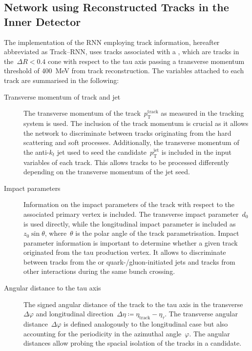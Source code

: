 \subsection{Network using Reconstructed Tracks in the Inner Detector}
\label{sec:rnn_tracks}

The implementation of the RNN employing track information, hereafter abbreviated
as Track--RNN, uses tracks associated with a \tauhadvis, which are tracks in
the~$\Delta R < 0.4$ cone with respect to the tau axis passing a transverse
momentum threshold of \SI{400}{\MeV} from track reconstruction. The variables
attached to each track are summarised in the following:
\begin{description}
\item[Transverse momentum of track and jet] The transverse momentum of the
  track~$p_\text{T}^\text{track}$ as measured in the tracking system is used.
  The inclusion of the track momentum is crucial as it allows the network to
  discriminate between tracks originating from the hard scattering and soft
  processes. Additionally, the transverse momentum of the anti-$k_t$ jet
  used to seed the \tauhadvis candidate~$p_\text{T}^\text{jet}$ is included in
  the input variables of each track. This allows tracks to be processed
  differently depending on the transverse momentum of the jet seed.

\item[Impact parameters] Information on the impact parameters of the track with
  respect to the associated primary vertex is included. The transverse impact
  parameter~$d_0$ is used directly, while the longitudinal impact parameter is
  included as~$z_0 \sin\theta$, where~$\theta$ is the polar angle of the track
  parametrisation.
  Impact parameter information is important to determine whether a given track
  originated from the tau production vertex. It allows to discriminate between
  tracks from the \tauhad or quark-/gluon-initiated jets and tracks from other
  interactions during the same bunch crossing.

\item[Angular distance to the tau axis] The signed angular distance of the track
  to the tau axis in the transverse~$\Delta \varphi$ and longitudinal
  direction~$\Delta \eta \coloneqq \eta_\text{track} - \eta_\tau$. The transverse
  angular distance~$\Delta \varphi$ is defined analogously to the longitudinal
  case but also accounting for the periodicity in the azimuthal angle~$\varphi$.
  The angular distances allow probing the spacial isolation of the tracks in a
  \tauhadvis candidate.


\end{description}
